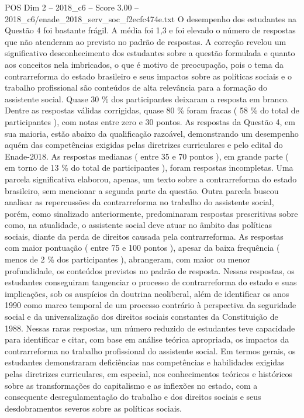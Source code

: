 \begin{textsample}{POS Dim 2 – 2018\_c6 – Score 3.00 – 2018\_c6/enade\_2018\_serv\_soc\_f2ecfc474e.txt}
O desempenho dos estudantes na Questão 4 foi bastante frágil.
A média foi 1,3 e foi elevado o número de respostas que não atenderam ao previsto no padrão de respostas.
A correção revelou um significativo desconhecimento dos estudantes sobre a questão formulada e quanto aos conceitos nela imbricados, o que é motivo de preocupação, pois o tema da contrarreforma do estado brasileiro e seus impactos sobre as políticas sociais e o trabalho profissional são conteúdos de alta relevância para a formação do assistente social.
Quase 30 \% dos participantes deixaram a resposta em branco.
Dentre as respostas válidas corrigidas, quase 80 \% foram fracas ( 58 \% do total de participantes ), com notas entre zero e 30 pontos.
As respostas da Questão 4, em sua maioria, estão abaixo da qualificação razoável, demonstrando um desempenho aquém das competências exigidas pelas diretrizes curriculares e pelo edital do Enade-2018.
As respostas medianas ( entre 35 e 70 pontos ), em grande parte ( em torno de 13 \% do total de participantes ), foram respostas incompletas.
Uma parcela significativa elaborou, apenas, um texto sobre a contrarreforma do estado brasileiro, sem mencionar a segunda parte da questão.
Outra parcela buscou analisar as repercussões da contrarreforma no trabalho do assistente social, porém, como sinalizado anteriormente, predominaram respostas prescritivas sobre como, na atualidade, o assistente social deve atuar no âmbito das políticas sociais, diante da perda de direitos causada pela contrarreforma.
As respostas com maior pontuação ( entre 75 e 100 pontos ), apesar da baixa frequência ( menos de 2 \% dos participantes ), abrangeram, com maior ou menor profundidade, os conteúdos previstos no padrão de resposta.
Nessas respostas, os estudantes conseguiram tangenciar o processo de contrarreforma do estado e suas implicações, sob os auspícios da doutrina neoliberal, além de identificar os anos 1990 como marco temporal de um processo contrário à perspectiva da seguridade social e da universalização dos direitos sociais constantes da Constituição de 1988.
Nessas raras respostas, um número reduzido de estudantes teve capacidade para identificar e citar, com base em análise teórica apropriada, os impactos da contrarreforma no trabalho profissional do assistente social.
Em termos gerais, os estudantes demonstraram deficiências nas competências e habilidades exigidas pelas diretrizes curriculares, em especial, nos conhecimentos teóricos e históricos sobre as transformações do capitalismo e as inflexões no estado, com a consequente desregulamentação do trabalho e dos direitos sociais e seus desdobramentos severos sobre as políticas sociais.

\end{textsample}
